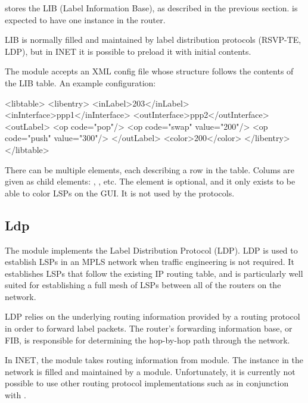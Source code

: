  stores the LIB (Label Information Base), as described
in the previous section.  is expected to have one instance
in the router. 

LIB is normally filled and maintained by label distribution protocols (RSVP-TE,
LDP), but in INET it is possible to preload it with initial contents.

The  module accepts an XML config file whose structure
follows the contents of the LIB table. An example configuration:

\begin{XML}
<libtable>
    <libentry>
        <inLabel>203</inLabel>
        <inInterface>ppp1</inInterface>
        <outInterface>ppp2</outInterface>
        <outLabel>
            <op code="pop"/>
            <op code="swap" value="200"/>
            <op code="push" value="300"/>
        </outLabel>
        <color>200</color>
    </libentry>
</libtable>
\end{XML}

There can be multiple  elements, each describing a row in the
table. Colums are given as child elements: , ,
etc. The  element is optional, and it only exists to be able to
color LSPs on the GUI. It is not used by the protocols.

\subsection{Ldp}

The  module implements the Label Distribution Protocol (LDP).
LDP is used to establish LSPs in an MPLS network when traffic engineering is not
required. It establishes LSPs that follow the existing IP routing table, and is
particularly well suited for establishing a full mesh of LSPs between all of the
routers on the network.

LDP relies on the underlying routing information provided by a routing protocol
in order to forward label packets. The router's forwarding information base, or
FIB, is responsible for determining the hop-by-hop path through the network.

In INET, the  module takes routing information from 
module. The  instance in the network is filled and maintained
by a  module. Unfortunately, it is currently not
possible to use other routing protocol implementations such as  
in conjunction with . 

